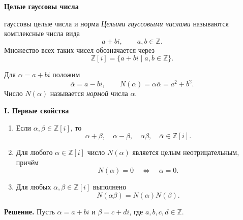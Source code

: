
\begin{center}
    {\LARGE\bfseries Целые гауссовы числа}
\end{center}


\begin{defbox}{гауссовы целые числа и норма}
\emph{Целыми гауссовыми числами} называются комплексные числа вида
\[
    a+bi,\qquad a,b\in\mathbb Z.
\]
Множество всех таких чисел обозначается через
\[
    \mathbb Z[i]=\{a+bi\mid a,b\in\mathbb Z\}.
\]

Для $\alpha=a+bi$ положим
\[
    \overline{\alpha}=a-bi,
    \qquad
    N(\alpha)=\alpha\overline{\alpha}=a^2+b^2.
\]
Число $N(\alpha)$ называется \emph{нормой} числа $\alpha$.
\end{defbox}

\begin{center}
    {\large\bfseries I. Первые свойства}
\end{center}


\begin{enumerate}[label=\textbf{\alph*)}, leftmargin=8mm]
    \item Если $\alpha,\beta\in\mathbb Z[i]$, то
    \[
        \alpha+\beta,\quad \alpha-\beta,\quad
        \alpha\beta,\quad \overline{\alpha}
        \in\mathbb Z[i].
    \]

    \item Для любого $\alpha\in\mathbb Z[i]$ число $N(\alpha)$ является
    целым неотрицательным, причём
    \[
        N(\alpha)=0\quad\Longleftrightarrow\quad \alpha=0.
    \]

    \item Для любых $\alpha,\beta\in\mathbb Z[i]$ выполнено
    \[
        N(\alpha\beta)=N(\alpha)N(\beta).
    \]
\end{enumerate}

\smallskip
\textbf{Решение.}
Пусть $\alpha=a+bi$ и $\beta=c+di$, где $a,b,c,d\in\mathbb Z$.


